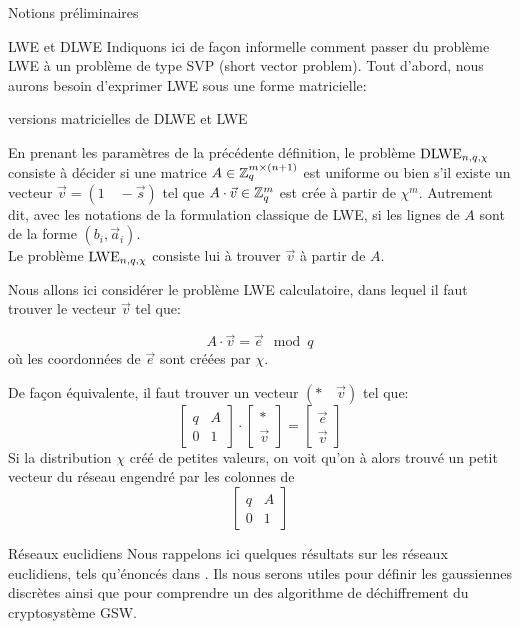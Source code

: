 \begin{section}{Notions préliminaires}
\begin{subsection}{LWE et DLWE}
	Indiquons ici de façon informelle comment passer du problème LWE à un 
	problème de type SVP (short vector problem).
	Tout d'abord, nous aurons besoin d'exprimer LWE sous une forme
	matricielle:

	\begin{definition}{versions matricielles de DLWE et LWE}

	En prenant les paramètres de la précédente définition, le problème $\text{DLWE}_{n,q,\chi}$ consiste à décider si une matrice $A \in \mathbb{Z}_q^{m \times (n+1)}$ est uniforme ou bien s'il existe un vecteur $\vec{v} = (1\quad -\vec{s})$ tel que $A \cdot \vec{v} \in \mathbb{Z}_q^{m}$ est crée à partir de $\chi^m$. Autrement dit, avec les notations de la formulation classique de LWE, si les lignes de $A$ sont de la forme $(b_i, \vec{a}_i)$. \\
	Le problème $\text{LWE}_{n,q,\chi}$ consiste lui à trouver $\vec{v}$ à partir de $A$.
	\end{definition}



	Nous allons ici considérer le problème LWE calculatoire, dans lequel il
	faut trouver le vecteur $\vec{v}$ tel que:

	\[ A\cdot \vec{v} = \vec{e} \mod q \]
	où les coordonnées de $\vec{e}$ sont créées par $\chi$.

	De façon équivalente, il faut trouver un vecteur $(*\quad\vec{v})$ tel
	que:
	\[ \begin{bmatrix}q & A \\ 0 &1 \end{bmatrix}\cdot
	   \begin{bmatrix}* \\ \vec{v} \end{bmatrix} =
	   \begin{bmatrix} \vec{e} \\ \vec{v} \end{bmatrix} \]
	Si la distribution $\chi$ créé de petites valeurs, on voit qu'on à
	alors trouvé un \og petit \fg vecteur du réseau engendré par les colonnes de 
	\[ \begin{bmatrix}q & A \\ 0 &1 \end{bmatrix} \]
	\end{subsection}

	\begin{subsection}{Réseaux euclidiens}
	Nous rappelons ici quelques résultats sur les réseaux
	euclidiens, tels qu'énoncés dans \cite{EC:MicPei12}. 
	Ils nous serons utiles pour définir les gaussiennes discrètes ainsi que pour comprendre un des algorithme de 
	déchiffrement du cryptosystème GSW. 


\end{subsection}
\end{section}
